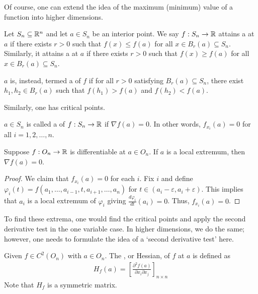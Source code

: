 Of course, one can extend the idea of the maximum (minimum) value of a function into higher dimensions.

\begin{definition}
    Let $S_{n} \subseteq \mathbb{R}^{n}$ and let $a \in S_{n}$ be an interior point. We say $f:S_{n} \to \mathbb{R}$ attains a  at $a$ if there exists $r > 0$ such that $f(x) \leq f(a)$ for all $x \in B_{r}(a) \subseteq S_{n}$. Similarly, it attains a  at $a$ if there exists $r > 0$ such that $f(x) \geq f(a)$ for all $x \in B_{r}(a) \subseteq S_{n}$.

    $a$ is, instead, termed a  of $f$ if for all $r > 0$ satisfying $B_{r}(a) \subseteq S_{n}$, there exist $h_{1},h_{2} \in B_{r}(a)$ such that $f(h_{1}) > f(a)$ and $f(h_{2}) < f(a)$.
\end{definition}

Similarly, one has critical points.

\begin{definition}
    $a \in S_{n}$ is called a  of $f:S_{n} \to \mathbb{R}$ if $\nabla f(a) = 0$. In other words, $f_{x_{i}}(a) = 0$ for all $i = 1,2,\ldots,n$.
\end{definition}

\begin{theorem}
    Suppose $f:O_{n} \to \mathbb{R}$ is differentiable at $a \in O_{n}$. If $a$ is a local extremum, then $\nabla f(a) = 0$.
\end{theorem}

\begin{proof}
    We claim that $f_{x_{i}}(a) = 0$ for each $i$. Fix $i$ and define $\varphi_{i}(t) = f(a_{1},\ldots,a_{i-1},t,a_{i+1},\ldots,a_{n})$ for $t \in (a_{i}-\varepsilon,a_{i}+\varepsilon)$. This implies that $a_{i}$ is a local extremum of $\varphi_{i}$ giving $\frac{d\varphi_{i}}{dt}(a_{i}) = 0$. Thus, $f_{x_{i}}(a) = 0$.
\end{proof}

To find these extrema, one would find the critical points and apply the second derivative test in the one variable case. In higher dimensions, we do the same; however, one needs to formulate the idea of a `second derivative test' here.

\begin{definition}
    Given $f \in C^{2}(O_{n})$ with $a \in O_{n}$. The , or Hessian, of $f$ at $a$ is defined as
    \begin{align}
        H_{f}(a) = \left[ \frac{\partial^{2} f(a)}{\partial x_{i} \partial x_{j}} \right]_{n \times n}
    \end{align}
    Note that $H_{f}$ is a symmetric matrix.
\end{definition}

